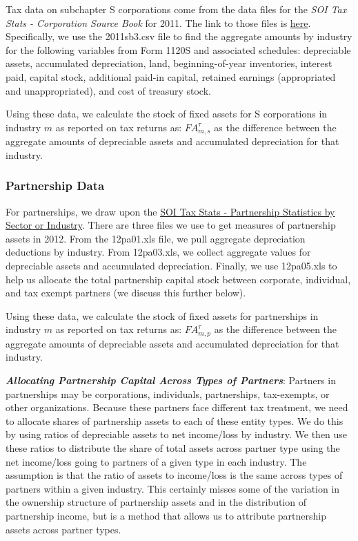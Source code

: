 \documentclass[article,11pt,letterpaper,fleqn]{article}
\theoremstyle{definition}
\numberwithin{equation}{section}
\begin{document}
Tax data on subchapter S corporations come from the data files for the \emph{SOI Tax Stats - Corporation Source Book} for 2011.  The link to those files is \href{http://www.irs.gov/uac/SOI-Tax-Stats-Corporation-Source-Book:-Data-File}{here}.  Specifically, we use the 2011sb3.csv file to find the aggregate amounts by industry for the following variables from Form 1120S and associated schedules: depreciable assets, accumulated depreciation, land, beginning-of-year inventories, interest paid, capital stock, additional paid-in capital, retained earnings (appropriated and unappropriated), and cost of treasury stock.  

Using these data, we calculate the stock of fixed assets for S corporations in industry $m$ as reported on tax returns as: ${FA}^{\tau}_{m,s}$ as the difference between the aggregate amounts of depreciable assets and accumulated depreciation for that industry. 

\subsubsection{Partnership Data}

For partnerships, we draw upon the \href{http://www.irs.gov/uac/SOI-Tax-Stats-Partnership-Statistics-by-Sector-or-Industry}{SOI Tax Stats - Partnership Statistics by Sector or Industry}.  There are three files we use to get measures of partnership assets in 2012.  From the 12pa01.xls file, we pull aggregate depreciation deductions by industry.  From 12pa03.xls, we collect aggregate values for depreciable assets and accumulated depreciation.  Finally, we use 12pa05.xls to help us allocate the total partnership capital stock between corporate, individual, and tax exempt partners (we discuss this further below).

Using these data, we calculate the stock of fixed assets for partnerships in industry $m$ as reported on tax returns as: ${FA}^{\tau}_{m,p}$ as the difference between the aggregate amounts of depreciable assets and accumulated depreciation for that industry.  
 
\textbf{\emph{Allocating Partnership Capital Across Types of Partners}}: Partners in partnerships may be corporations, individuals, partnerships, tax-exempts, or other organizations.  Because these partners face different tax treatment, we need to allocate shares of partnership assets to each of these entity types.  We do this by using ratios of depreciable assets to net income/loss by industry.  We then use these ratios to distribute the share of total assets across partner type using the net income/loss going to partners of a given type in each industry.  The assumption is that the ratio of assets to income/loss is the same across types of partners within a given industry.  This certainly misses some of the variation in the ownership structure of partnership assets and in the distribution of partnership income, but is a method that allows us to attribute partnership assets across partner types.
\end{document}
